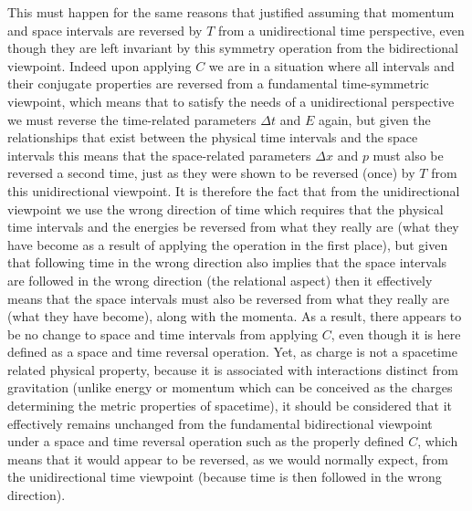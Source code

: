 \documentclass[notitlepage,12pt]{report}
\begin{document}
This must happen for the same reasons that justified assuming that momentum and space intervals are reversed by $T$ from a unidirectional time perspective, even though they are left invariant by this symmetry operation from the bidirectional viewpoint. Indeed upon applying $C$ we are in a situation where all intervals and their conjugate properties are reversed from a fundamental time-symmetric viewpoint, which means that to satisfy the needs of a unidirectional perspective we must reverse the time-related parameters $\Delta t$ and $E$ again, but given the relationships that exist between the physical time intervals and the space intervals this means that the space-related parameters $\Delta x$ and $p$ must also be reversed a second time, just as they were shown to be reversed (once) by $T$ from this unidirectional viewpoint. It is therefore the fact that from the unidirectional viewpoint we use the wrong direction of time which requires that the physical time intervals and the energies be reversed from what they really are (what they have become as a result of applying the operation in the first place), but given that following time in the wrong direction also implies that the space intervals are followed in the wrong direction (the relational aspect) then it effectively means that the space intervals must also be reversed from what they really are (what they have become), along with the momenta. As a result, there appears to be no change to space and time intervals from applying $C$, even though it is here defined as a space and time reversal operation. Yet, as charge is not a spacetime related physical property, because it is associated with interactions distinct from gravitation (unlike energy or momentum which can be conceived as the charges determining the metric properties of spacetime), it should be considered that it effectively remains unchanged from the fundamental bidirectional viewpoint under a space and time reversal operation such as the properly defined $C$, which means that it would appear to be reversed, as we would normally expect, from the unidirectional time viewpoint (because time is then followed in the wrong direction).
\end{document}

